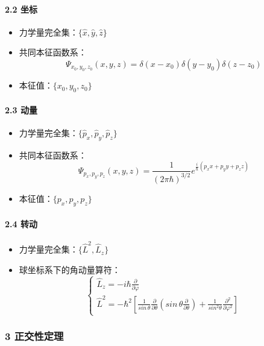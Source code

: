 \documentclass[UTF8,twocolumn]{ctexart}
\providecommand{\tightlist}{%
  \setlength{\itemsep}{0pt}\setlength{\parskip}{0pt}}
\let\oldparagraph\paragraph
\renewcommand{\paragraph}[1]{\oldparagraph{#1}\mbox{}}
\begin{document}
\hypertarget{ux5750ux6807}{%
\paragraph{ 2.2 坐标}\label{ux5750ux6807}}

\begin{itemize}
\tightlist
\item
  力学量完全集：\(\{\hat{x},\hat{y},\hat{z}\}\)
\item
  共同本征函数系：
  $$\Psi_{x_0,y_0,z_0}(x,y,z)=\delta(x-x_0)\delta(y-y_0)\delta(z-z_0)$$
\item
  本征值：\(\{x_0,y_0,z_0\}\)
\end{itemize}

\hypertarget{ux52a8ux91cf}{%
\paragraph{ 2.3 动量}\label{ux52a8ux91cf}}

\begin{itemize}
\tightlist
\item
  力学量完全集：\(\{\hat{p}_x,\hat{p}_y,\hat{p}_z\}\)
\item
  共同本征函数系：
  $$\Psi_{p_x,p_y,p_z}(x,y,z)=\frac{1}{(2\pi\hbar)^{3/2}}e^{\frac{i}{\hbar}(p_xx+p_yy+p_zz)}$$
\item
  本征值：\(\{p_x,p_y,p_z\}\)
\end{itemize}

\hypertarget{ux8f6cux52a8}{%
\paragraph{ 2.4 转动}\label{ux8f6cux52a8}}

\begin{itemize}
\tightlist
\item
  力学量完全集：\(\{\hat{L}^2,\hat{L}_z\}\)
\item
  球坐标系下的角动量算符：
  \[\begin{cases}
  \hat{L}_z=-i\hbar\frac{\partial}{\partial\varphi}\\
  \hat{L}^2=-\hbar^2[\frac{1}{sin\,\theta}\frac{\partial}{\partial\theta}(sin\,\theta\frac{\partial}{\partial\theta})+\frac{1}{sin^2\theta}\frac{\partial^2}{\partial\varphi^2}]
  \end{cases}\]
\end{itemize}

\hypertarget{ux6b63ux4ea4ux6027ux5b9aux7406}{%
\subsubsection{3 正交性定理}\label{ux6b63ux4ea4ux6027ux5b9aux7406}}
\end{document}

